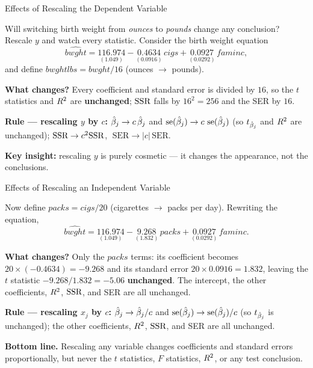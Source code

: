 \documentclass[aspectratio=169, 12pt]{beamer}
\begin{document}
\begin{frame}[shrink=8]{Effects of Rescaling the Dependent Variable}

  Will switching birth weight from \emph{ounces} to \emph{pounds} change any conclusion?
  Rescale $y$ and watch every statistic. Consider the birth weight equation
  \[
    \widehat{bwght} = \underset{(1.049)}{116.974}
      - \underset{(0.0916)}{0.4634}\, cigs
      + \underset{(0.0292)}{0.0927}\, faminc ,
  \]
  and define $bwghtlbs = bwght/16$ (ounces $\to$ pounds).

  \medskip

  \textbf{What changes?} Every coefficient and standard error is divided by $16$, so the
  $t$ statistics and $R^2$ are \textbf{unchanged}; $\text{SSR}$ falls by $16^2 = 256$ and the
  SER by $16$.

  \begin{keybox}
    \textbf{Rule --- rescaling $y$ by $c$:}\;
    $\hat{\beta}_j \to c\,\hat{\beta}_j$ and $\operatorname{se}(\hat{\beta}_j) \to c\,\operatorname{se}(\hat{\beta}_j)$ (so $t_{\hat{\beta}_j}$ and
    $R^2$ are unchanged); $\text{SSR} \to c^2\text{SSR}$, $\;\text{SER} \to |c|\,\text{SER}$.

    \smallskip
    \textbf{Key insight:} rescaling $y$ is purely cosmetic --- it changes the appearance,
    not the conclusions.
  \end{keybox}

\end{frame}

\begin{frame}[shrink=8]{Effects of Rescaling an Independent Variable}

  Now define $packs = cigs/20$ (cigarettes $\to$ packs per day). Rewriting the equation,
  \[
    \widehat{bwght} = \underset{(1.049)}{116.974}
      - \underset{(1.832)}{9.268}\, packs
      + \underset{(0.0292)}{0.0927}\, faminc .
  \]

  \medskip

  \textbf{What changes?} Only the $packs$ terms: its coefficient becomes
  $20\times(-0.4634) = -9.268$ and its standard error $20\times0.0916 = 1.832$, leaving
  the $t$ statistic $-9.268/1.832 = -5.06$ \textbf{unchanged}. The intercept, the other
  coefficients, $R^2$, $\text{SSR}$, and SER are all unchanged.

  \begin{keybox}
    \textbf{Rule --- rescaling $x_j$ by $c$:}\;
    $\hat{\beta}_j \to \hat{\beta}_j/c$ and $\operatorname{se}(\hat{\beta}_j) \to \operatorname{se}(\hat{\beta}_j)/c$ (so $t_{\hat{\beta}_j}$ is
    unchanged); the other coefficients, $R^2$, $\text{SSR}$, and SER are all unchanged.
  \end{keybox}

  \medskip

  \textbf{Bottom line.} Rescaling any variable changes coefficients and standard errors
  proportionally, but never the $t$ statistics, $F$ statistics, $R^2$, or any test
  conclusion.

\end{frame}
\end{document}
